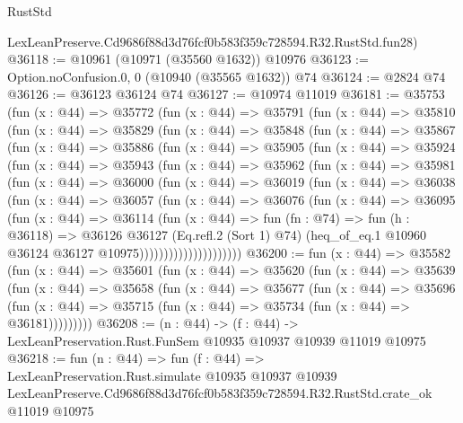 \begin{lexlean}{RustStd}
\begin{coremodule}
    LexLeanPreserve.Cd9686f88d3d76fcf0b583f359c728594.R32.RustStd.fun28)
@36118 := @10961 (@10971 (@35560 @1632)) @10976
@36123 := Option.noConfusion.{0, 0} (@10940 (@35565 @1632)) @74
@36124 := @2824 @74
@36126 := @36123 @36124 @74
@36127 := @10974 @11019
@36181 := @35753
    (fun (x : @44) =>
    @35772
      (fun (x : @44) =>
      @35791
        (fun (x : @44) =>
        @35810
          (fun (x : @44) =>
          @35829
            (fun (x : @44) =>
            @35848
              (fun (x : @44) =>
              @35867
                (fun (x : @44) =>
                @35886
                  (fun (x : @44) =>
                  @35905
                    (fun (x : @44) =>
                    @35924
                      (fun (x : @44) =>
                      @35943
                        (fun (x : @44) =>
                        @35962
                          (fun (x : @44) =>
                          @35981
                            (fun (x : @44) =>
                            @36000
                              (fun (x : @44) =>
                              @36019
                                (fun (x : @44) =>
                                @36038
                                  (fun (x : @44) =>
                                  @36057
                                    (fun (x : @44) =>
                                    @36076
                                      (fun (x : @44) =>
                                      @36095
                                        (fun (x : @44) =>
                                        @36114
                                          (fun (x : @44) =>
                                          fun (fn : @74) =>
                                          fun (h : @36118) =>
                                          @36126
                                            @36127
                                            (Eq.refl.{2} (Sort 1) @74)
                                            (heq_of_eq.{1}
                                              @10960
                                              @36124
                                              @36127
                                              @10975)))))))))))))))))))))
@36200 := fun (x : @44) =>
  @35582
    (fun (x : @44) =>
    @35601
      (fun (x : @44) =>
      @35620
        (fun (x : @44) =>
        @35639
          (fun (x : @44) =>
          @35658
            (fun (x : @44) =>
            @35677
              (fun (x : @44) =>
              @35696
                (fun (x : @44) => @35715 (fun (x : @44) => @35734 (fun (x : @44) => @36181)))))))))
@36208 := (n : @44) ->
  (f : @44) -> LexLeanPreservation.Rust.FunSem @10935 @10937 @10939 @11019 @10975
@36218 := fun (n : @44) =>
  fun (f : @44) =>
  LexLeanPreservation.Rust.simulate
    @10935
    @10937
    @10939
    LexLeanPreserve.Cd9686f88d3d76fcf0b583f359c728594.R32.RustStd.crate_ok
    @11019
    @10975
\end{coremodule}
\end{lexlean}
